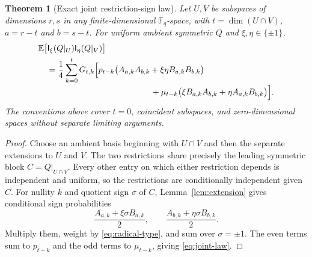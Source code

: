 \documentclass[11pt,a4paper]{article}
\newtheorem{theorem}{Theorem}[section]
\theoremstyle{definition}
\theoremstyle{remark}
\newcommand{\F}{\mathbb F}
\newcommand{\E}{\mathbb E}
\newcommand{\I}{\mathsf I}
\begin{document}
\begin{theorem}[Exact joint restriction-sign law]\label{thm:joint}
Let $U,V$ be subspaces of dimensions $r,s$ in any finite-dimensional
$\F_q$-space, with $t=\dim(U\cap V)$, $a=r-t$ and $b=s-t$.
For uniform ambient symmetric $Q$ and $\xi,\eta\in\{\pm1\}$,
\begin{align}
 &\E\bigl[\I_\xi(Q|_U)\I_\eta(Q|_V)\bigr]\notag\\
 &\quad=\frac14\sum_{k=0}^{t}G_{t,k}\Bigl[
 p_{t-k}\bigl(A_{a,k}A_{b,k}+\xi\eta B_{a,k}B_{b,k}\bigr)
 \notag\\[-2pt]
 &\hspace{47mm}
 +\mu_{t-k}\bigl(\xi B_{a,k}A_{b,k}+\eta A_{a,k}B_{b,k}\bigr)
 \Bigr].\label{eq:joint-law}
\end{align}
The conventions above cover $t=0$, coincident subspaces, and
zero-dimensional spaces without separate limiting arguments.
\end{theorem}
\begin{proof}
Choose an ambient basis beginning with $U\cap V$ and then the separate
extensions to $U$ and $V$. The two restrictions share precisely the leading
symmetric block $C=Q|_{U\cap V}$. Every other entry on which either
restriction depends is independent and uniform, so the restrictions are
conditionally independent given $C$.
For nullity $k$ and quotient sign $\sigma$ of $C$, Lemma~\ref{lem:extension}
gives conditional sign probabilities
\[
 \frac{A_{a,k}+\xi\sigma B_{a,k}}2,
 \qquad \frac{A_{b,k}+\eta\sigma B_{b,k}}2.
\]
Multiply them, weight by \eqref{eq:radical-type}, and sum over
$\sigma=\pm1$. The even terms sum to $p_{t-k}$ and the odd terms to
$\mu_{t-k}$, giving \eqref{eq:joint-law}.
\end{proof}
\end{document}
